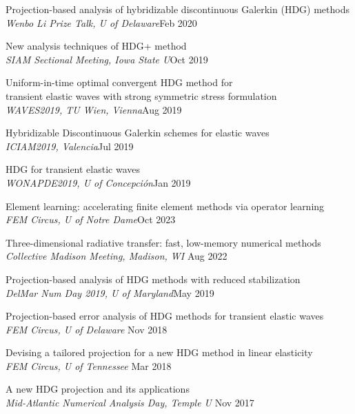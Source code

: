 \documentclass[11pt]{res}
\newenvironment{cvenumerate}{\begin{etaremune}\itemsep -2pt}{\end{etaremune}\vspace{-5pt}}
\begin{document}
\begin{resume}
\begin{cvenumerate}
\item
Projection-based analysis of hybridizable discontinuous
Galerkin (HDG) methods\\
{\sl Wenbo Li Prize Talk, U of Delaware}\hfill Feb 2020

\item New analysis techniques of HDG+ method\\
{\sl SIAM Sectional Meeting, Iowa State U}\hfill Oct 2019

\item
Uniform-in-time optimal convergent HDG method for\\
transient elastic waves with strong symmetric stress formulation\\
{\sl WAVES2019, TU Wien, Vienna}\hfill Aug 2019

\item
Hybridizable Discontinuous Galerkin schemes for elastic waves\\
{\sl ICIAM2019, Valencia}\hfill Jul 2019

\item
HDG for transient elastic waves\\
{\sl WONAPDE2019, U of Concepción}\hfill Jan 2019

\item[]\item[]
\hspace{-1cm}{\bf Contributed talks}
\item Element learning: accelerating finite element methods via operator learning\\
{\sl FEM Circus, U of Notre Dame}\hfill Oct 2023

\item 
Three-dimensional radiative transfer: fast, low-memory
numerical methods\\
{\sl Collective Madison Meeting, Madison, WI}
\hfill Aug 2022

\item
Projection-based analysis of HDG methods with reduced stabilization\\
{\sl DelMar Num Day 2019, U of Maryland}\hfill May 2019
\item
Projection-based error analysis of HDG methods for transient elastic waves\\
{\sl FEM Circus, U of Delaware} \hfill Nov 2018
\item
Devising a tailored projection for a new HDG method in linear elasticity\\
{\sl FEM Circus, U of Tennessee} \hfill Mar 2018
\item
A new HDG projection and its applications\\
{\sl Mid-Atlantic Numerical Analysis Day, Temple U} \hfill Nov 2017


\end{cvenumerate}
\end{resume}
\end{document}
